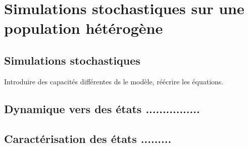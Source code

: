 
\chapter{Simulations stochastiques sur une population hétérogène}

\section{Simulations stochastiques}

Introduire des capacités différentes ds le modèle, réécrire les équations.

\section{Dynamique vers des états ................}

\section{Caractérisation des états .........}
